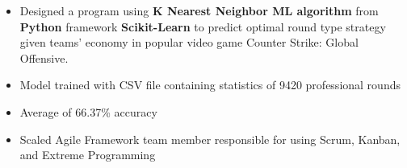 







\smallskip
\begin{itemize}
\item Designed a program using \textbf{K Nearest Neighbor ML algorithm} from \textbf{Python} framework \textbf{Scikit-Learn} to predict optimal round type strategy given teams' economy in popular video game Counter Strike: Global Offensive.
\smallskip
\item Model trained with CSV file containing statistics of 9420 professional rounds
\smallskip
\item Average of 66.37\% accuracy
\end{itemize}






\begin{itemize}
\item Scaled Agile Framework team member responsible for using Scrum, Kanban, and Extreme Programming
\end{itemize}



